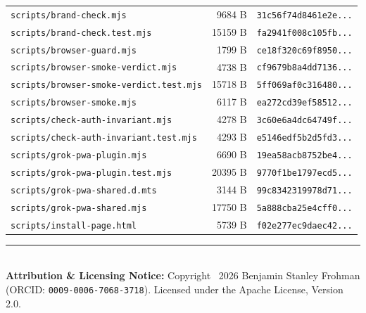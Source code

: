 \documentclass[11pt,a4paper]{article}
\begin{document}
\begin{center}
\begin{tabular}{p{}rr}
\texttt{scripts/brand-check.mjs} & 9684 B & \texttt{31c56f74d8461e2e...} \\
\texttt{scripts/brand-check.test.mjs} & 15159 B & \texttt{fa2941f008c105fb...} \\
\texttt{scripts/browser-guard.mjs} & 1799 B & \texttt{ce18f320c69f8950...} \\
\texttt{scripts/browser-smoke-verdict.mjs} & 4738 B & \texttt{cf9679b8a4dd7136...} \\
\texttt{scripts/browser-smoke-verdict.test.mjs} & 15718 B & \texttt{5ff069af0c316480...} \\
\texttt{scripts/browser-smoke.mjs} & 6117 B & \texttt{ea272cd39ef58512...} \\
\texttt{scripts/check-auth-invariant.mjs} & 4278 B & \texttt{3c60e6a4dc64749f...} \\
\texttt{scripts/check-auth-invariant.test.mjs} & 4293 B & \texttt{e5146edf5b2d5fd3...} \\
\texttt{scripts/grok-pwa-plugin.mjs} & 6690 B & \texttt{19ea58acb8752be4...} \\
\texttt{scripts/grok-pwa-plugin.test.mjs} & 20395 B & \texttt{9770f1be1797ecd5...} \\
\texttt{scripts/grok-pwa-shared.d.mts} & 3144 B & \texttt{99c8342319978d71...} \\
\texttt{scripts/grok-pwa-shared.mjs} & 17750 B & \texttt{5a888cba25e4cff0...} \\
\texttt{scripts/install-page.html} & 5739 B & \texttt{f02e277ec9daec42...} \\
\bottomrule
\end{tabular}
\end{center}

\vfill
\noindent\rule{\textwidth}{0.4pt}\\
\footnotesize
\textbf{Attribution \& Licensing Notice:} Copyright \textcopyright\ 2026 Benjamin Stanley Frohman (ORCID: \texttt{0009-0006-7068-3718}).
Licensed under the Apache License, Version 2.0.
\end{document}
